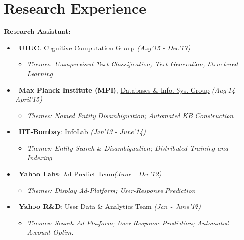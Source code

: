 \section{\mysidestyle Research Experience} 
\vspace{0mm}
\textsf{\textbf{Research Assistant:}}
\begin{itemize}[leftmargin = 0.7cm]\compresslist
\item~\textbf{UIUC}: \href{http://cogcomp.org/}{Cognitive Computation Group} \hfill{\small\textit{(Aug'15 - Dec'17)}} \vspace{-1mm}
\begin{itemize}[leftmargin=*]\compresslist
        \item[]\small\textit{Themes: Unsupervised Text Classification; Text Generation; Structured Learning}
    \end{itemize}
  
\item~\textbf{Max Planck Institute (MPI)}, \href{https://www.mpi-inf.mpg.de/departments/databases-and-information-systems/}{Databases \& Info. Sys. Group}  \hfill{\small\textit{(Aug'14 - April'15)}}
\vspace{-1mm}
\begin{itemize}[leftmargin=*]\compresslist
        \item[]\small\textit{Themes: Named Entity Disambiguation; Automated KB Construction}
    \end{itemize}

\item~\textbf{IIT-Bombay}: \href{http://www.cse.iitb.ac.in/infolab}{InfoLab} \hfill{\small\textit{(Jan'13 - June'14)}}
\vspace{-1mm}
\begin{itemize}[leftmargin=*]\compresslist
        \item[]\small\textit{Themes: Entity Search} \&\textit{ Disambiguation; Distributed Training and Indexing}
    \end{itemize}
\item~\textbf{Yahoo Labs}: \href{https://research.yahoo.com/research-areas/advertising-science}{Ad-Predict Team}\hfill{\small\textit{(June - Dec'12)}}
\vspace{-1mm}
\begin{itemize}[leftmargin=*]\compresslist
        \item[]\small\textit{Themes: Display Ad-Platform; User-Response Prediction}
    \end{itemize}
\item~\textbf{Yahoo R\&D}: User Data \& Analytics Team \hfill{\small\textit{(Jan - June'12)}}
\vspace{-1mm}
\begin{itemize}[leftmargin=*]\compresslist
        \item[]\small\textit{Themes: Search Ad-Platform; User-Response Prediction; Automated Account Optim.}
    \end{itemize}
\end{itemize}